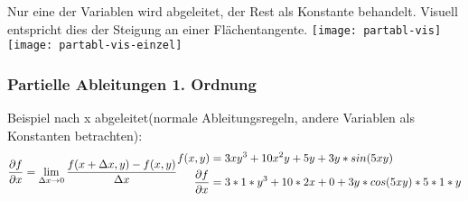 Nur eine der Variablen wird abgeleitet, der Rest als Konstante behandelt.
Visuell entspricht dies der Steigung an einer Flächentangente. \vfill
\texttt{[image: partabl-vis]}
\texttt{[image: partabl-vis-einzel]}


\subsubsection{Partielle Ableitungen 1. Ordnung}
Beispiel nach x abgeleitet(normale Ableitungsregeln, andere Variablen als Konstanten
betrachten):
$$
	\frac{\partial f}{\partial x} =
	\lim \limits_{\Delta x \to 0} \frac{f(x + \Delta x, y) - f(x,y)}{\Delta x} \\

	\begin{align*}
		f(x, y)                       & = 3xy^3 + 10x^2y + 5y + 3y * sin(5xy) \\
		\frac{\partial f}{\partial x} & =
		3 * 1 * y^3 + 10 * 2x + 0 + 3y * cos(5xy) * 5 * 1 * y
	\end{align*}
$$

